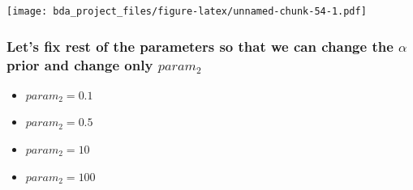 \documentclass[
]{article}
\providecommand{\tightlist}{%
  \setlength{\itemsep}{0pt}\setlength{\parskip}{0pt}}
\begin{document}
\texttt{[image: bda\_project\_files/figure-latex/unnamed-chunk-54-1.pdf]}

\hypertarget{lets-fix-rest-of-the-parameters-so-that-we-can-change-the-alpha-prior-and-change-only-param_2}{%
\subsubsection{\texorpdfstring{Let's fix rest of the parameters so that
we can change the \(\alpha\) prior and change only
\(param_2\)}{Let's fix rest of the parameters so that we can change the \textbackslash alpha prior and change only param\_2}}\label{lets-fix-rest-of-the-parameters-so-that-we-can-change-the-alpha-prior-and-change-only-param_2}}

\begin{itemize}
\tightlist
\item
  \(param_2 = 0.1\)
\item
  \(param_2 = 0.5\)
\item
  \(param_2 = 10\)
\item
  \(param_2 = 100\)
\end{itemize}
\end{document}
